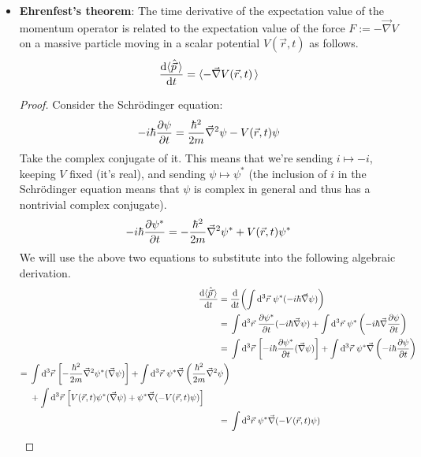 \documentclass[../notes.tex]{subfiles}
\begin{document}
\begin{itemize}
    \item \textbf{Ehrenfest's theorem}: The time derivative of the expectation value of the momentum operator is related to the expectation value of the force $F:=-\vec{\nabla}V$ on a massive particle moving in a scalar potential $V(\vec{r},t)$ as follows.
    \begin{equation*}
        \dv{\langle{\hat{\vec{p}}}\,\rangle}{t} = \langle{-\vec{\nabla}V(\vec{r},t)}\,\rangle
    \end{equation*}
    \begin{proof}
        Consider the Schr\"{o}dinger equation:
        \begin{equation*}
            -i\hbar\pdv{\psi}{t} = \frac{\hbar^2}{2m}\vec{\nabla}^2\psi-V(\vec{r},t)\psi
        \end{equation*}
        Take the complex conjugate of it. This means that we're sending $i\mapsto -i$, keeping $V$ fixed (it's real), and sending $\psi\mapsto\psi^*$ (the inclusion of $i$ in the Schr\"{o}dinger equation means that $\psi$ is complex in general and thus has a nontrivial complex conjugate).
        \begin{equation*}
            -i\hbar\pdv{\psi^*}{t} = -\frac{\hbar^2}{2m}\vec{\nabla}^2\psi^*+V(\vec{r},t)\psi^*
        \end{equation*}
        We will use the above two equations to substitute into the following algebraic derivation.
        \begin{align*}
            \dv{\Exp{\hat{\vec{p}}}}{t} ={}& \dv{t}(\int\dd^3\vec{r}\ \psi^*(-i\hbar\vec{\nabla}\psi))\\
            ={}& \int\dd^3\vec{r}\ {\pdv{\psi^*}{t}}(-i\hbar\vec{\nabla}\psi)+\int\dd^3\vec{r}\ \psi^*\left( -i\hbar\vec{\nabla}\pdv{\psi}{t} \right)\\
            ={}& \int\dd^3\vec{r}\,\left[ -i\hbar{\pdv{\psi^*}{t}}(\vec{\nabla}\psi) \right]+\int\dd^3\vec{r}\ \psi^*\vec{\nabla}\left( -i\hbar\pdv{\psi}{t} \right)\\
            \begin{split}
                ={}& \int\dd^3\vec{r}\,\left[ -\frac{\hbar^2}{2m}\vec{\nabla}^2\psi^*(\vec{\nabla}\psi) \right]+\int\dd^3\vec{r}\ \psi^*\vec{\nabla}\left( \frac{\hbar^2}{2m}\vec{\nabla}^2\psi \right)\\
                & +\int\dd^3\vec{r}\,\left[ V(\vec{r},t)\psi^*(\vec{\nabla}\psi)+\psi^*\vec{\nabla}(-V(\vec{r},t)\psi) \right]
            \end{split}\\
            ={}& \int\dd^3\vec{r}\ \psi^*\vec{\nabla}(-V(\vec{r},t)\psi)\\

\end{align*}
\end{proof}
\end{itemize}
\end{document}
